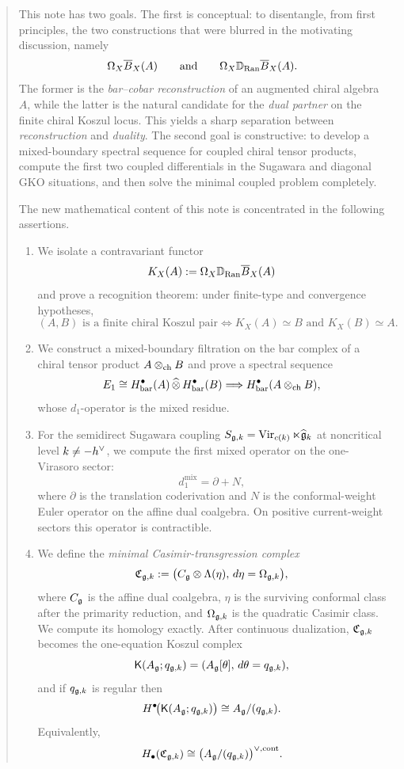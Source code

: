 \begin{abstract}
This note has two goals. The first is conceptual: to disentangle, from first principles, the two constructions that were blurred in the motivating discussion, namely
\[
\Cob_X \Bbar_X(A)
\qquad\text{and}\qquad
\Cob_X \D_{\Ran}\Bbar_X(A).
\]
The former is the \emph{bar--cobar reconstruction} of an augmented chiral algebra \(A\), while the latter is the natural candidate for the \emph{dual partner} on the finite chiral Koszul locus. This yields a sharp separation between \emph{reconstruction} and \emph{duality}. The second goal is constructive: to develop a mixed-boundary spectral sequence for coupled chiral tensor products, compute the first two coupled differentials in the Sugawara and diagonal GKO situations, and then solve the minimal coupled problem completely.

The new mathematical content of this note is concentrated in the following assertions.

\begin{enumerate}[label=\textup{(\Roman*)},leftmargin=2.2em]
\item We isolate a contravariant functor
\[
K_X(A):=\Cob_X \D_{\Ran}\Bbar_X(A)
\]
and prove a recognition theorem: under finite-type and convergence hypotheses,
\[
(A,B)\text{ is a finite chiral Koszul pair}
\iff
K_X(A)\simeq B \text{ and } K_X(B)\simeq A.
\]

\item We construct a mixed-boundary filtration on the bar complex of a chiral tensor product \(A\otch B\) and prove a spectral sequence
\[
E_1 \cong H^\bullet_{\mathrm{bar}}(A)\,\widehat\otimes\, H^\bullet_{\mathrm{bar}}(B)
\Longrightarrow
H^\bullet_{\mathrm{bar}}(A\otch B),
\]
whose \(d_1\)-operator is the mixed residue.

\item For the semidirect Sugawara coupling \(S_{\g,k}=\Vir_{c(k)}\ltimes \widehat{\g}_k\) at noncritical level \(k\neq -\hh\), we compute the first mixed operator on the one-Virasoro sector:
\[
d_1^{\mathrm{mix}}=\partial + N,
\]
where \(\partial\) is the translation coderivation and \(N\) is the conformal-weight Euler operator on the affine dual coalgebra. On positive current-weight sectors this operator is contractible.

\item We define the \emph{minimal Casimir-transgression complex}
\[
\mathfrak C_{\g,k}:=\bigl(C_{\g}\otimes \Lambda(\eta),\,d\eta=\Omega_{\g,k}\bigr),
\]
where \(C_{\g}\) is the affine dual coalgebra, \(\eta\) is the surviving conformal class after the primarity reduction, and \(\Omega_{\g,k}\) is the quadratic Casimir class. We compute its homology exactly. After continuous dualization, \(\mathfrak C_{\g,k}\) becomes the one-equation Koszul complex
\[
\Kcpx(A_{\g};q_{\g,k})=(A_{\g}[\theta],\,d\theta=q_{\g,k}),
\]
and if \(q_{\g,k}\) is regular then
\[
H^\bullet\!\bigl(\Kcpx(A_{\g};q_{\g,k})\bigr)\cong A_{\g}/(q_{\g,k}).
\]
Equivalently,
\[
H_\bullet(\mathfrak C_{\g,k})\cong \bigl(A_{\g}/(q_{\g,k})\bigr)^{\vee,\cont}.
\]


\end{enumerate}
\end{abstract}
